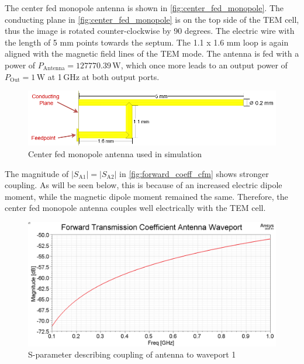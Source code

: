 The center fed monopole antenna is shown in \autoref{fig:center_fed_monopole}. The conducting plane in \autoref{fig:center_fed_monopole} is on the top side of the TEM cell, thus the image is rotated counter-clockwise by 90 degrees. The electric wire with the length of 5 mm points towards the septum. The 1.1 x 1.6 mm loop is again aligned with the magnetic field lines of the TEM mode. The antenna is fed with a power of $P_\mathrm{Antenna}=127770.39\,\mathrm{W}$, which once more leads to an output power of $P_\mathrm{Out}=1\,\mathrm{W}$ at 1\,GHz at both output ports. 

\begin{figure}[h]
    \centering
    \includegraphics[width=0.75\linewidth]{content//30_simulations//img/center_fed_monopole.png}
    \caption{Center fed monopole antenna used in simulation}
    \label{fig:center_fed_monopole}
\end{figure}

The magnitude of $|S_\mathrm{A1}|=|S_\mathrm{A2}|$ in \autoref{fig:forward_coeff_cfm} shows stronger coupling. As will be seen below, this is because of an increased electric dipole moment, while the magnetic dipole moment remained the same. Therefore, the center fed monopole antenna couples well electrically with the TEM cell.

\begin{figure}[h]
    \centering
    \includegraphics[width=1\linewidth]{content//30_simulations//img/forward_coeff_cfm.png}
    \caption{S-parameter describing coupling of antenna to waveport 1}
    \label{fig:forward_coeff_cfm}
\end{figure}


